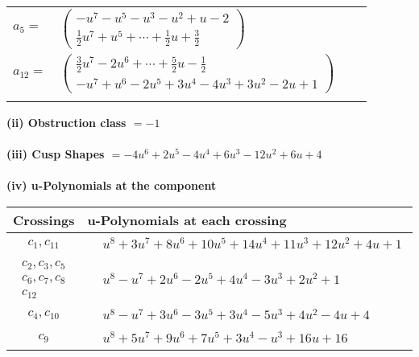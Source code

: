 \documentclass[1p]{elsarticle_modified}
\theoremstyle{definition}
\begin{document}
\begin{tabular}{m{7pt} m{180pt} m{7pt} m{180pt} }
\flushright $a_{5}=$&$\begin{pmatrix}- u^7- u^5- u^3- u^2+u-2\\\frac{1}{2} u^7+u^5+\cdots+\frac{1}{2} u+\frac{3}{2}\end{pmatrix}$ \\
\flushright $a_{12}=$&$\begin{pmatrix}\frac{3}{2} u^7-2 u^6+\cdots+\frac{5}{2} u-\frac{1}{2}\\- u^7+u^6-2 u^5+3 u^4-4 u^3+3 u^2-2 u+1\end{pmatrix}$\\&\end{tabular}
\flushleft \textbf{(ii) Obstruction class $= -1$}\\~\\
\flushleft \textbf{(iii) Cusp Shapes $= -4 u^6+2 u^5-4 u^4+6 u^3-12 u^2+6 u+4$}\\~\\
\newpage\renewcommand{\arraystretch}{1}
\flushleft \textbf{(iv) u-Polynomials at the component}\newline \\
\begin{tabular}{m{50pt}|m{274pt}}
Crossings & \hspace{64pt}u-Polynomials at each crossing \\
\hline $$\begin{aligned}c_{1},c_{11}\end{aligned}$$&$\begin{aligned}
&u^8+3 u^7+8 u^6+10 u^5+14 u^4+11 u^3+12 u^2+4 u+1
\end{aligned}$\\
\hline $$\begin{aligned}c_{2},c_{3},c_{5}\\c_{6},c_{7},c_{8}\\c_{12}\end{aligned}$$&$\begin{aligned}
&u^8- u^7+2 u^6-2 u^5+4 u^4-3 u^3+2 u^2+1
\end{aligned}$\\
\hline $$\begin{aligned}c_{4},c_{10}\end{aligned}$$&$\begin{aligned}
&u^8- u^7+3 u^6-3 u^5+3 u^4-5 u^3+4 u^2-4 u+4
\end{aligned}$\\
\hline $$\begin{aligned}c_{9}\end{aligned}$$&$\begin{aligned}
&u^8+5 u^7+9 u^6+7 u^5+3 u^4- u^3+16 u+16
\end{aligned}$\\
\hline
\end{tabular}\\~\\
\end{document}

